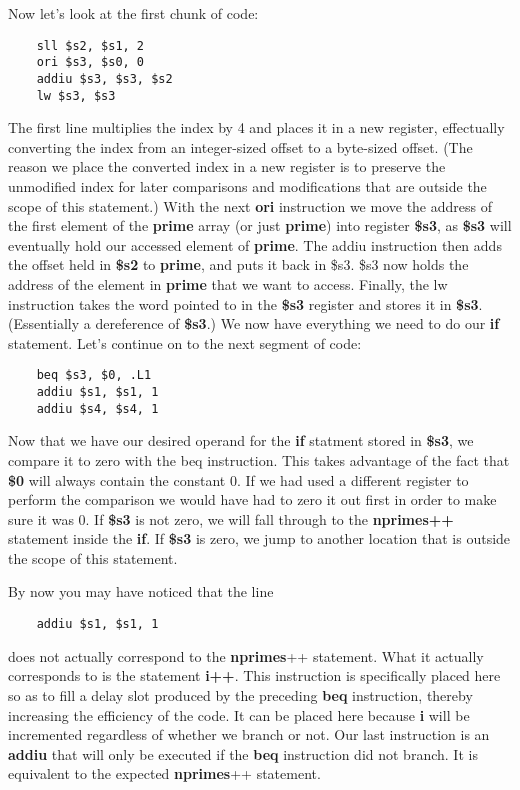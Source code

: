 \documentclass[11pt]{article}
\begin{document}
Now let's look at the first chunk of code:

\begin{verbatim}
    sll $s2, $s1, 2
    ori $s3, $s0, 0
    addiu $s3, $s3, $s2
    lw $s3, $s3
\end{verbatim}

The first line multiplies the index by 4 and places it in a new register, effectually converting the index from an integer-sized offset to a byte-sized offset. (The reason we place the converted index in a new register is to preserve the unmodified index for later comparisons and modifications that are outside the scope of this statement.) With the next \textbf{ori} instruction we move the address of the first element of the \textbf{prime} array (or just \textbf{prime}) into register \textbf{\$s3}, as \textbf{\$s3} will eventually hold our accessed element of \textbf{prime}. The addiu instruction then adds the offset held in \textbf{\$s2} to \textbf{prime}, and puts it back in \$s3. \$s3 now holds the address of the element in \textbf{prime} that we want to access. Finally, the lw instruction takes the word pointed to in the \textbf{\$s3} register and stores it in \textbf{\$s3}. (Essentially a dereference of \textbf{\$s3}.) We now have everything we need to do our \textbf{if} statement. Let's continue on to the next segment of code:

\begin{verbatim}
    beq $s3, $0, .L1
    addiu $s1, $s1, 1
    addiu $s4, $s4, 1
\end{verbatim}

Now that we have our desired operand for the \textbf{if} statment stored in \textbf{\$s3}, we compare it to zero with the beq instruction. This takes advantage of the fact that \textbf{\$0} will always contain the constant 0. If we had used a different register to perform the comparison we would have had to zero it out first in order to make sure it was 0. If \textbf{\$s3} is not zero, we will fall through to the \textbf{nprimes++} statement inside the \textbf{if}. If \textbf{\$s3} is zero, we jump to another location that is outside the scope of this statement. 

By now you may have noticed that the line

\begin{verbatim}
    addiu $s1, $s1, 1
\end{verbatim}

does not actually correspond to the \textbf{nprimes}++ statement. What it actually corresponds to is the statement \textbf{i++}. This instruction is specifically placed here so as to fill a delay slot produced by the preceding \textbf{beq} instruction, thereby increasing the efficiency of the code. It can be placed here because \textbf{i} will be incremented regardless of whether we branch or not. Our last instruction is an \textbf{addiu} that will only be executed if the \textbf{beq} instruction did not branch. It is equivalent to the expected \textbf{nprimes}++ statement.
\end{document}
